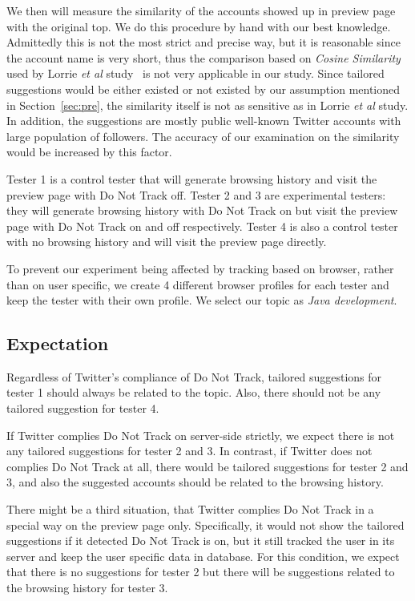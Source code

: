 \documentclass{sig-alternate}
\begin{document}
We then will measure the similarity of the accounts showed up in preview page with the original top. We do this procedure by hand with our best knowledge. Admittedly this is not the most strict and precise way, but it is reasonable since the account name is very short, thus the comparison based on \emph{Cosine Similarity} used by Lorrie \emph{et al} study~\cite{balebako2012measuring} is not very applicable in our study. Since tailored suggestions would be either existed or not existed by our assumption mentioned in Section~\ref{sec:pre}, the similarity itself is not as sensitive as in Lorrie \emph{et al} study. In addition, the suggestions are mostly public well-known Twitter accounts with large population of followers. The accuracy of our examination on the similarity would be increased by this factor.

Tester 1 is a control tester that will generate browsing history and visit the preview page with Do Not Track off. Tester 2 and 3 are experimental testers: they will generate browsing history with Do Not Track on but visit the preview page with Do Not Track on and off respectively. Tester 4 is also a control tester with no browsing history and will visit the preview page directly.

To prevent our experiment being affected by tracking based on browser, rather than on user specific, we create 4 different browser profiles for each tester and keep the tester with their own profile. We select our topic as \emph{Java development}.

\subsection{Expectation} \label{sec:expect}

Regardless of Twitter's compliance of Do Not Track, tailored suggestions for tester 1 should always be related to the topic. Also, there should not be any tailored suggestion for tester 4.

If Twitter complies Do Not Track on server-side strictly, we expect there is not any tailored suggestions for tester 2 and 3. In contrast, if Twitter does not complies Do Not Track at all, there would be tailored suggestions for tester 2 and 3, and also the suggested accounts should be related to the browsing history.

There might be a third situation, that Twitter complies Do Not Track in a special way on the preview page only. Specifically, it would not show the tailored suggestions if it detected Do Not Track is on, but it still tracked the user in its server and keep the user specific data in database. For this condition, we expect that there is no suggestions for tester 2 but there will be suggestions related to the browsing history for tester 3.
\end{document}
